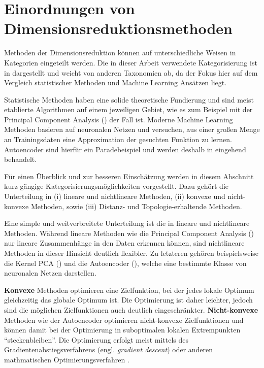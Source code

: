 \section{Einordnungen von Dimensionsreduktionsmethoden}
\label{ch:Dimensionsreduktion:Ansaetze}
Methoden der Dimensionsreduktion können auf unterschiedliche Weisen in Kategorien eingeteilt werden. Die in dieser Arbeit verwendete Kategorisierung ist in  dargestellt und weicht von anderen Taxonomien ab, da der Fokus hier auf dem Vergleich statistischer Methoden und Machine Learning Ansätzen liegt.


Statistische Methoden haben eine solide theoretische Fundierung und sind meist etablierte
Algorithmen auf einem jeweiligen Gebiet, wie es zum Beispiel mit der Principal Component Analysis
() der Fall ist. Moderne Machine Learning Methoden
basieren auf neuronalen Netzen und versuchen, aus einer großen Menge an Trainingsdaten eine
Approximation der gesuchten Funktion zu lernen. Autoencoder sind hierfür ein Paradebeispiel und
werden deshalb in  eingehend behandelt.

Für einen Überblick und zur besseren Einschätzung werden in diesem Abschnitt kurz gängige
Kategorisierungsmöglichkeiten vorgestellt. Dazu gehört die Unterteilung in (i) lineare und
nichtlineare Methoden, (ii) konvexe und nicht-konvexe Methoden, sowie (iii) Distanz- und
Topologie-erhaltende Methoden.

Eine simple und weitverbreitete Unterteilung ist die in lineare und nichtlineare Methoden. Während
lineare Methoden wie die Principal Component Analysis
() nur lineare Zusammenhänge in den Daten erkennen
können, sind nichtlineare Methoden in dieser Hinsicht deutlich flexibler. Zu letzteren gehören
beispielsweise die Kernel PCA () und die Autoencoder
(), welche eine bestimmte Klasse von neuronalen Netzen
darstellen.

\textbf{Konvexe} Methoden optimieren eine Zielfunktion, bei der jedes lokale Optimum gleichzeitig das globale Optimum ist. Die Optimierung ist daher leichter, jedoch sind die möglichen Zielfunktionen auch deutlich eingeschränkter. \textbf{Nicht-konvexe} Methoden wie der Autoencoder optimieren nicht-konvexe Zielfunktionen und können damit bei der Optimierung in suboptimalen lokalen Extrempunkten \enquote{steckenbleiben}. Die Optimierung erfolgt meist mittels des Gradientenabstiegsverfahrens (engl. \textit{gradient descent}) oder anderen mathmatischen Optimierungsverfahren \parencite[siehe z.B.][]{Guler.2010}.

